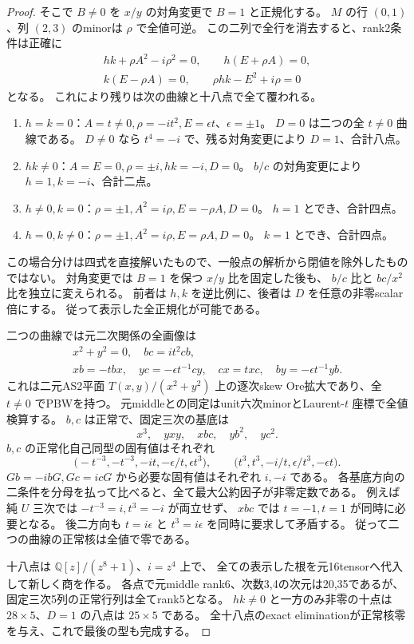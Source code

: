 \begin{proof}
そこで $B\ne0$ を $x/y$ の対角変更で $B=1$ と正規化する。
$M$ の行 $(0,1)$、列 $(2,3)$ のminorは $\rho$ で全値可逆。
この二列で全行を消去すると、rank2条件は正確に
\begin{gather*}
 hk+\rho A^2-i\rho^2=0,\qquad h(E+\rho A)=0,\\
 k(E-\rho A)=0,\qquad \rho hk-E^2+i\rho=0
\end{gather*}
となる。
これにより残りは次の曲線と十八点で全て覆われる。
\begin{enumerate}
\item $h=k=0$：$A=t\ne0,\rho=-it^2,E=\epsilon t$、$\epsilon=\pm1$。
$D=0$ は二つの全 $t\ne0$ 曲線である。
$D\ne0$ なら $t^4=-i$ で、残る対角変更により $D=1$、合計八点。
\item $hk\ne0$：$A=E=0,\rho=\pm i,hk=-i,D=0$。
$b/c$ の対角変更により $h=1,k=-i$、合計二点。
\item $h\ne0,k=0$：$\rho=\pm1,A^2=i\rho,E=-\rho A,D=0$。
$h=1$ とでき、合計四点。
\item $h=0,k\ne0$：$\rho=\pm1,A^2=i\rho,E=\rho A,D=0$。
$k=1$ とでき、合計四点。
\end{enumerate}
この場合分けは四式を直接解いたもので、一般点の解析から閉値を除外したものではない。
対角変更では $B=1$ を保つ $x/y$ 比を固定した後も、
$b/c$ 比と $bc/x^2$ 比を独立に変えられる。
前者は $h,k$ を逆比例に、後者は $D$ を任意の非零scalar倍にする。
従って表示した全正規化が可能である。

二つの曲線では元二次関係の全画像は
\begin{gather*}
 x^2+y^2=0,\quad bc=it^2cb,\\
 xb=-tbx,\quad yc=-\epsilon t^{-1}cy,\quad
 cx=txc,\quad by=-\epsilon t^{-1}yb.
\end{gather*}
これは二元AS2平面 $T(x,y)/(x^2+y^2)$ 上の逐次skew Ore拡大であり、全 $t\ne0$ でPBWを持つ。
元middleとの同定はunit六次minorとLaurent-$t$ 座標で全値検算する。
$b,c$ は正常で、固定三次の基底は
\[
 x^3,\quad yxy,\quad xbc,\quad yb^2,\quad yc^2.
\]
$b,c$ の正常化自己同型の固有値はそれぞれ
\[
 \bigl(-t^{-3},-t^{-3},-it,-\epsilon/t,\epsilon t^3\bigr),
 \qquad
 \bigl(t^3,t^3,-i/t,\epsilon/t^3,-\epsilon t\bigr).
\]
$Gb=-ibG,Gc=icG$ から必要な固有値はそれぞれ $i,-i$ である。
各基底方向の二条件を分母を払って比べると、全て最大公約因子が非零定数である。
例えば純 $U$ 三次では $-t^{-3}=i,t^3=-i$ が両立せず、
$xbc$ では $t=-1,t=1$ が同時に必要となる。
後二方向も $t=i\epsilon$ と $t^3=i\epsilon$ を同時に要求して矛盾する。
従って二つの曲線の正常核は全値で零である。

十八点は $\mathbb Q[z]/(z^8+1)$、$i=z^4$ 上で、
全ての表示した根を元16tensorへ代入して新しく商を作る。
各点で元middle rank6、次数3,4の次元は20,35であるが、
固定三次5列の正常行列は全てrank5となる。
$hk\ne0$ と一方のみ非零の十点は $28\times5$、$D=1$ の八点は $25\times5$ である。
全十八点のexact eliminationが正常核零を与え、これで最後の型も完成する。
\end{proof}


